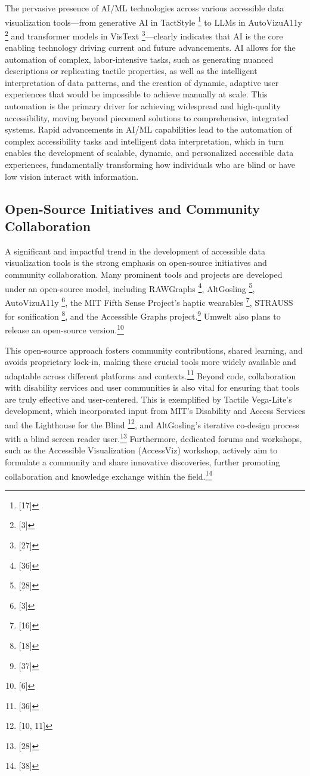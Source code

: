 The pervasive presence of AI/ML technologies across various accessible data visualization tools---from generative AI in TactStyle \footnote{[17]} to LLMs in AutoVizuA11y \footnote{[3]} and transformer models in VisText \footnote{[27]}---clearly indicates that AI is the core enabling technology driving current and future advancements. AI allows for the automation of complex, labor-intensive tasks, such as generating nuanced descriptions or replicating tactile properties, as well as the intelligent interpretation of data patterns, and the creation of dynamic, adaptive user experiences that would be impossible to achieve manually at scale. This automation is the primary driver for achieving widespread and high-quality accessibility, moving beyond piecemeal solutions to comprehensive, integrated systems. Rapid advancements in AI/ML capabilities lead to the automation of complex accessibility tasks and intelligent data interpretation, which in turn enables the development of scalable, dynamic, and personalized accessible data experiences, fundamentally transforming how individuals who are blind or have low vision interact with information.

\subsection{Open-Source Initiatives and Community Collaboration}
A significant and impactful trend in the development of accessible data visualization tools is the strong emphasis on open-source initiatives and community collaboration. Many prominent tools and projects are developed under an open-source model, including RAWGraphs \footnote{[36]}, AltGosling \footnote{[28]}, AutoVizuA11y \footnote{[3]}, the MIT Fifth Sense Project's haptic wearables \footnote{[16]}, STRAUSS for sonification \footnote{[18]}, and the Accessible Graphs project.\footnote{[37]} Umwelt also plans to release an open-source version.\footnote{[6]}

This open-source approach fosters community contributions, shared learning, and avoids proprietary lock-in, making these crucial tools more widely available and adaptable across different platforms and contexts.\footnote{[36]} Beyond code, collaboration with disability services and user communities is also vital for ensuring that tools are truly effective and user-centered. This is exemplified by Tactile Vega-Lite's development, which incorporated input from MIT's Disability and Access Services and the Lighthouse for the Blind \footnote{[10, 11]}, and AltGosling's iterative co-design process with a blind screen reader user.\footnote{[28]} Furthermore, dedicated forums and workshops, such as the Accessible Visualization (AccessViz) workshop, actively aim to formulate a community and share innovative discoveries, further promoting collaboration and knowledge exchange within the field.\footnote{[38]}

